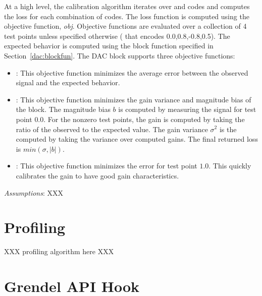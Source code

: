\begin{algorithmic}
    \EndFor
  \EndFor

  \EndFor
\end{algorithmic}

At a high level, the calibration algorithm iterates over  and
 codes and computes the loss for each combination of codes. The
loss function is computed using the objective function, \textit{obj}. Objective
functions are evaluated over a collection of 4
test points unless specified otherwise ( that encodes
0.0,0.8,-0.8,0.5). The expected behavior is computed using the block function
specified in Section~\ref{dac:blockfun}. The DAC block supports three objective functions:
\begin{itemize}
\item{}: This objective function minimizes the average
  error between the observed signal and the expected behavior. 
\item{}: This objective function minimizes the gain
  variance and magnitude bias of the block. The magnitude bias $b$ is computed
  by measuring the signal for test point $0.0$. For the nonzero test
  points, the gain is computed by taking the ratio of the observed to the
  expected value. The gain variance $\sigma^2$ is the computed by taking the
  variance over computed gains. The final returned loss is $min(\sigma,|b|)$.
  \item{}: This objective function minimizes the error for test
    point $1.0$. This quickly calibrates the gain to have good gain characteristics.
  \end{itemize}

\noindent\textit{Assumptions}: XXX
  
\section{Profiling}

XXX profiling algorithm here XXX

\section{Grendel API Hook}

